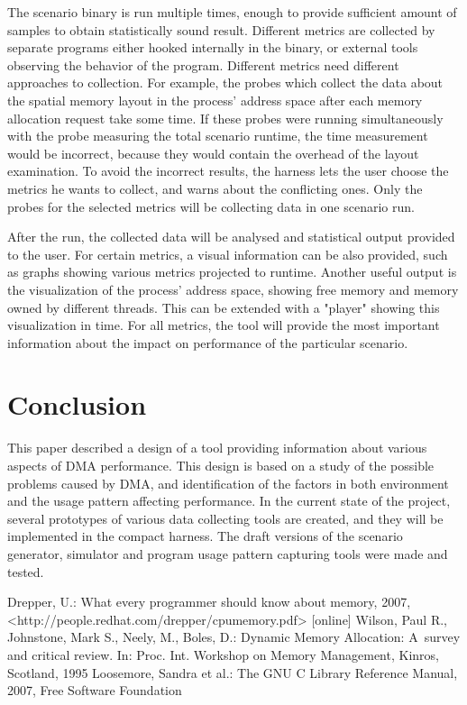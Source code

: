 \documentclass{eeict}
\begin{document}
The scenario binary is run multiple times, enough to provide sufficient amount of samples to obtain statistically sound result. Different metrics are collected by separate programs either hooked internally in the binary, or external tools observing the behavior of the program. Different metrics need different approaches to collection. For example, the probes which collect the data about the spatial memory layout in the process' address space after each memory allocation request take some time. If these probes were running simultaneously with the probe measuring the total scenario runtime, the time measurement would be incorrect, because they would contain the overhead of the layout examination. To avoid the incorrect results, the harness lets the user choose the metrics he wants to collect, and warns about the conflicting ones. Only the probes for the selected metrics will be collecting data in one scenario run.

After the run, the collected data will be analysed and statistical output provided to the user. For certain metrics, a visual information can be also provided, such as graphs showing various metrics projected to runtime. Another useful output is the visualization of the process' address space, showing free memory and memory owned by different threads. This can be extended with a "player" showing this visualization in time. For all metrics, the tool will provide the most important information about the impact on performance of the particular scenario.

\section{Conclusion}

This paper described a design of a tool providing information about various aspects of DMA performance. This design is based on a study of the possible problems caused by DMA, and identification of the factors in both environment and the usage pattern affecting performance. In the current state of the project, several prototypes of various data collecting tools are created, and they will be implemented in the compact harness. The draft versions of the scenario generator, simulator and program usage pattern capturing tools were made and tested.

\begin{thebibliography}{9}
    Drepper, U.: What every programmer should know about memory, 2007,
                     <http://people.redhat.com/drepper/cpumemory.pdf> [online]
    Wilson, Paul R., Johnstone, Mark S., Neely, M., Boles, D.: Dynamic Memory Allocation: A~survey and critical review. In: Proc. Int. Workshop on Memory Management, Kinros, Scotland, 1995
    Loosemore, Sandra et al.: The GNU C Library Reference Manual, 2007, Free Software Foundation

\end{thebibliography}
\end{document}
